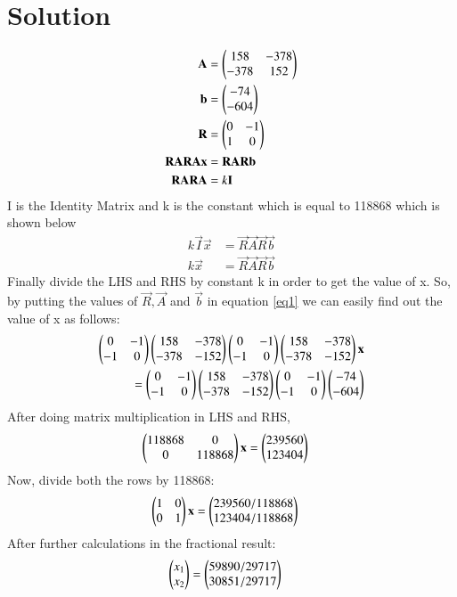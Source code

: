 \documentclass[journal,12pt,twocolumn]{IEEEtran}
\begin{document}
\section{Solution}
\begin{align}
\mathbf{A}&= \begin{pmatrix}158 & -378 \\ -378 & 152\end{pmatrix} \\
\mathbf{b}&= \begin{pmatrix}-74 \\ -604\end{pmatrix} \\
\mathbf{R}&= \begin{pmatrix}  0 & -1 \\ 1 & 0\end{pmatrix} \\
\mathbf{R}\mathbf{A}\mathbf{R}\mathbf{A}\mathbf{x}&= \mathbf{R}\mathbf{A}\mathbf{R}\mathbf{b} \label{eq1}\\
\mathbf{R}\mathbf{A}\mathbf{R}\mathbf{A}&= k \mathbf{I}
\end{align}
I is the Identity Matrix and k is the constant which is equal to 118868 which is shown below
\begin{align}
k\vec{I}\vec{x}&= \vec{R}\vec{A}\vec{R}\vec{b} \\
k\vec{x}&= \vec{R}\vec{A}\vec{R}\vec{b}
\end{align}
Finally divide the LHS and RHS by constant k in order to get the value of x.
So, by putting the values of $\vec{R}, \vec{A}$ and $\vec{b}$ in equation \ref{eq1} we can easily find out the value of x as follows:
\begin{align}
\begin{pmatrix}0 & -1 \\ -1 & 0\end{pmatrix}
\begin{pmatrix}158 & -378 \\ -378 & -152\end{pmatrix}
\begin{pmatrix}0 & -1 \\ -1 & 0\end{pmatrix}
\begin{pmatrix}158 & -378 \\ -378 & -152\end{pmatrix}\mathbf{x} \nonumber \\
=\begin{pmatrix}0 & -1 \\ -1 & 0\end{pmatrix}
\begin{pmatrix}158 & -378 \\ -378 & -152\end{pmatrix}
\begin{pmatrix}0 & -1 \\ -1 & 0\end{pmatrix}
\begin{pmatrix}-74 \\ -604\end{pmatrix}
\end{align}
After doing matrix multiplication in LHS and RHS,
\begin{align}
\begin{pmatrix}118868 & 0 \\ 0 & 118868\end{pmatrix}\mathbf{x}&=
\begin{pmatrix}239560 \\ 123404\end{pmatrix}
\end{align}
Now, divide both the rows by 118868:
\begin{align}
\begin{pmatrix}1 & 0 \\ 0 & 1\end{pmatrix}\mathbf{x}&=
\begin{pmatrix}239560/118868 \\ 123404/118868\end{pmatrix}
\end{align}
After further calculations in the fractional result:
\begin{align}
\begin{pmatrix}x_1 \\ x_2\end{pmatrix}&= \begin{pmatrix}59890/29717 \\ 30851/29717\end{pmatrix}
\end{align}
\end{document}
